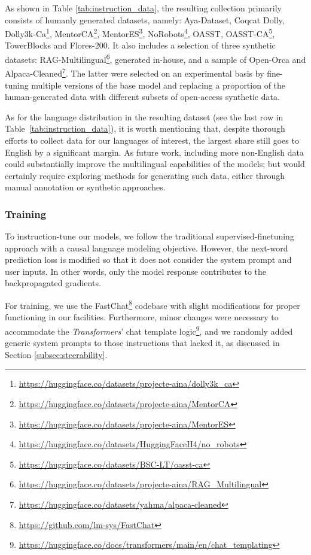 As shown in Table \ref{tab:instruction_data}, the resulting collection primarily consists of humanly generated datasets, namely: Aya-Dataset\cite{aya-dataset}, Coqcat \cite{gonzalez-aguirre_building_2024} Dolly\cite{dolly}, Dolly3k-Ca\footnote{\url{https://huggingface.co/datasets/projecte-aina/dolly3k_ca}}, MentorCA\footnote{\url{https://huggingface.co/datasets/projecte-aina/MentorCA}}, MentorES\footnote{\url{https://huggingface.co/datasets/projecte-aina/MentorES}}, NoRobots\footnote{\url{https://huggingface.co/datasets/HuggingFaceH4/no_robots}}, OASST\cite{oasst}, OASST-CA\footnote{\url{https://huggingface.co/datasets/BSC-LT/oasst-ca}}, TowerBlocks\cite{alves_tower_2024} and Flores-200\cite{nllb_language_2022}. It also includes a selection of three synthetic datasets: RAG-Multilingual\footnote{\url{https://huggingface.co/datasets/projecte-aina/RAG_Multilingual}}, generated in-house, and a sample of Open-Orca \cite{open-orca} and Alpaca-Cleaned\footnote{\url{https://huggingface.co/datasets/yahma/alpaca-cleaned}}. The latter were selected on an experimental basis by fine-tuning multiple versions of the base model and replacing a proportion of the human-generated data with different subsets of open-access synthetic data.

As for the language distribution in the resulting dataset (see the last row in \mbox{Table \ref{tab:instruction_data}}), it is worth mentioning that, despite thorough efforts to collect data for our languages of interest, the largest share still goes to English by a significant margin. As future work, including more non-English data could substantially improve the multilingual capabilities of the models; but would certainly require exploring methods for generating such data, either through manual annotation or synthetic approaches.


\subsubsection{Training}
\label{subsec:it_training}

To instruction-tune our models, we follow the traditional supervised-finetuning approach with a causal language modeling objective. However, the next-word prediction loss is modified so that it does not consider the system prompt and user inputs. In other words, only the model response contributes to the backpropagated gradients.



For training, we use the FastChat\footnote{\url{https://github.com/lm-sys/FastChat}} codebase with slight modifications for proper functioning in our facilities. Furthermore, minor changes were necessary to accommodate the \textit{Transformers}' chat template logic\footnote{\url{https://huggingface.co/docs/transformers/main/en/chat_templating}}, and we randomly added generic system prompts to those instructions that lacked it, as discussed in Section \ref{subsec:steerability}.

